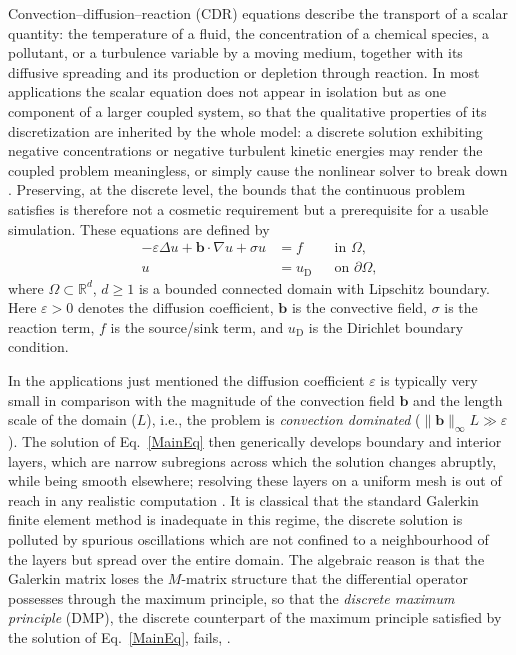 \documentclass[a4paper]{article}
\theoremstyle{plain}
\theoremstyle{definition}
\theoremstyle{remark}
\begin{document}
Convection--diffusion--reaction (CDR) equations describe the transport of a scalar
quantity: the temperature of a fluid, the concentration of a chemical species, a
pollutant, or a turbulence variable by a moving medium, together with its diffusive
spreading and its production or depletion through reaction.  In most applications the scalar
equation does not appear in isolation but as one component of a larger coupled system,
so that the qualitative properties of its discretization are inherited by the whole
model: a discrete solution exhibiting negative concentrations or negative turbulent
kinetic energies may render the coupled problem meaningless, or simply cause the
nonlinear solver to break down \cite{JR10}. Preserving, at the discrete level, the bounds that the
continuous problem satisfies is therefore not a cosmetic requirement but a
prerequisite for a usable simulation. These equations are defined by
\begin{equation}
	\begin{aligned}
		-\varepsilon \Delta u + \boldsymbol{b} \cdot \nabla u + \sigma u &= f && \text{in } \Omega, \\
		u &= u_{\mathrm{D}} && \text{on } \partial\Omega,
	\end{aligned}
	\label{MainEq}
\end{equation}
where $\Omega\subset \mathbb{R}^d$, $d\geq 1$ is a bounded connected domain with Lipschitz boundary. Here $\varepsilon>0$ denotes the diffusion coefficient, $\boldsymbol{b}$ is the convective field, $\sigma$ is the reaction term, $f$ is the source/sink term, and $u_{\mathrm{D}}$ is the Dirichlet boundary condition.

In the applications just mentioned the diffusion coefficient $\varepsilon$ is
typically very small in comparison with the magnitude of the convection field
$\boldsymbol{b}$ and the length scale of the domain ($L$), i.e., the problem is
\emph{convection dominated} ($\|\boldsymbol{b}\|_{\infty}L\gg \varepsilon$). The solution of Eq.~\eqref{MainEq} then generically develops
boundary and interior layers, which are narrow subregions across which the solution changes abruptly, while being smooth
elsewhere; resolving these layers on a uniform mesh is out of reach in any realistic
computation \cite{RST08}. 
It is classical that the standard Galerkin finite element method is inadequate in this
regime, the discrete solution is polluted by spurious oscillations which are not confined to a neighbourhood of the layers but spread over the entire domain. The algebraic reason is that the Galerkin matrix loses the $M$-matrix structure that the differential operator possesses through the maximum principle, so that the \emph{discrete maximum principle} (DMP), the discrete counterpart of the maximum principle satisfied by the solution of Eq.~\eqref{MainEq}, fails, \cite{BJK25}.
\end{document}

